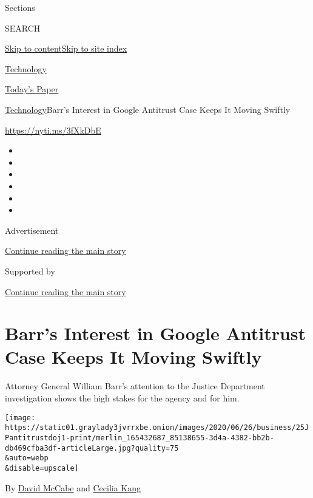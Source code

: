 Sections

SEARCH

\protect\hyperlink{site-content}{Skip to
content}\protect\hyperlink{site-index}{Skip to site index}

\href{https://www.nytimes3xbfgragh.onion/section/technology}{Technology}

\href{https://myaccount.nytimes3xbfgragh.onion/auth/login?response_type=cookie\&client_id=vi}{}

\href{https://www.nytimes3xbfgragh.onion/section/todayspaper}{Today's
Paper}

\href{/section/technology}{Technology}\textbar{}Barr's Interest in
Google Antitrust Case Keeps It Moving Swiftly

\url{https://nyti.ms/3fXkDbE}

\begin{itemize}
\item
\item
\item
\item
\item
\item
\end{itemize}

Advertisement

\protect\hyperlink{after-top}{Continue reading the main story}

Supported by

\protect\hyperlink{after-sponsor}{Continue reading the main story}

\hypertarget{barrs-interest-in-google-antitrust-case-keeps-it-moving-swiftly}{%
\section{Barr's Interest in Google Antitrust Case Keeps It Moving
Swiftly}\label{barrs-interest-in-google-antitrust-case-keeps-it-moving-swiftly}}

Attorney General William Barr's attention to the Justice Department
investigation shows the high stakes for the agency and for him.

\texttt{[image: https://static01.graylady3jvrrxbe.onion/images/2020/06/26/business/25JPantitrustdoj1-print/merlin\_165432687\_85138655-3d4a-4382-bb2b-db469cfba3df-articleLarge.jpg?quality=75\\\&auto=webp\\\&disable=upscale]}

By \href{https://www.nytimes3xbfgragh.onion/by/david-mccabe}{David
McCabe} and
\href{https://www.nytimes3xbfgragh.onion/by/cecilia-kang}{Cecilia Kang}

